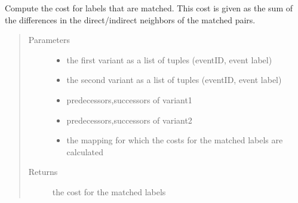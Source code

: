 \documentclass[letterpaper,10pt,english]{sphinxmanual}
\begin{document}
\begin{fulllineitems}
\label{\detokenize{cost function:costFunction.cost.costMatched}}
Compute the cost for labels that are matched. This cost is given as the sum of the differences in the direct/indirect neighbors of the matched pairs.
\begin{quote}\begin{description}
\item[{Parameters}] \leavevmode\begin{itemize}
\item {} 
 \textendash{} the first variant as a list of tuples (eventID, event label)

\item {} 
 \textendash{} the second variant as a list of tuples (eventID, event label)

\item {} 
 \textendash{} predecessors,successors of variant1

\item {} 
 \textendash{} predecessors,successors of variant2

\item {} 
 \textendash{} the mapping for which the costs for the matched labels are calculated

\end{itemize}

\item[{Returns}] \leavevmode
the cost for the matched labels

\end{description}\end{quote}

\end{fulllineitems}

\end{document}
